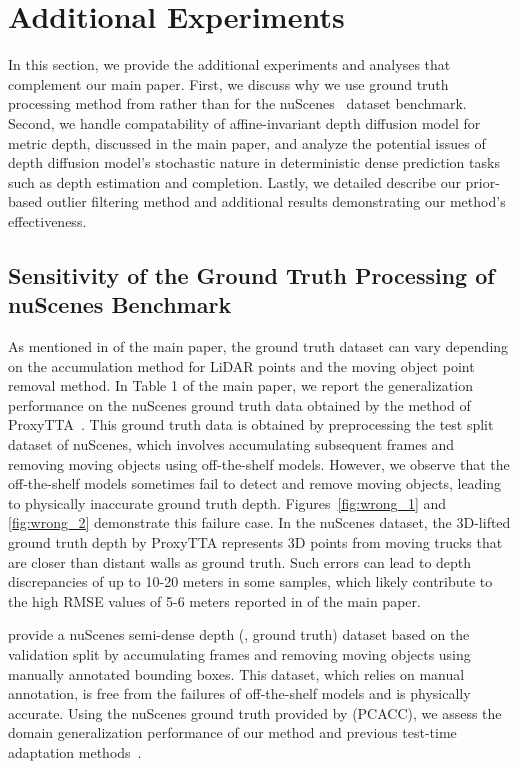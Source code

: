 \section{Additional Experiments}
In this section, we provide the additional experiments and analyses that complement our main paper.
First, we discuss why we use ground truth processing method from \citet{huang2022pcacc} rather than \citet{park2024testtime} for the nuScenes~\cite{caesar2020nuscene} dataset benchmark.
Second, we handle compatability of affine-invariant depth diffusion model for metric depth, discussed in the main paper, and analyze the potential issues of depth diffusion model's stochastic nature in deterministic dense prediction tasks such as depth estimation and completion. 
Lastly, we detailed describe our prior-based outlier filtering method and additional results demonstrating our method's effectiveness.




\subsection{Sensitivity of the Ground Truth Processing of nuScenes Benchmark}
As mentioned in  of the main paper, the ground truth dataset can vary depending on the accumulation method for LiDAR points and the moving object point removal method.
In Table 1 of the main paper, we report the generalization performance on the nuScenes ground truth data obtained 
by the method of ProxyTTA~\cite{park2024testtime}. This ground truth data is obtained by preprocessing the test split dataset of nuScenes, which involves accumulating subsequent frames and removing moving objects using off-the-shelf models.
However, we observe that the off-the-shelf models sometimes fail to detect and remove moving objects, leading to physically inaccurate ground truth depth. Figures~\ref{fig:wrong_1} and \ref{fig:wrong_2} demonstrate this failure case. In the nuScenes dataset, the 3D-lifted ground truth depth by ProxyTTA represents 3D points from moving trucks that are closer than distant walls as ground truth. Such errors can lead to depth discrepancies of up to 10-20 meters in some samples, which likely contribute to the high RMSE values of 5-6 meters reported in  of the main paper.

\citet{huang2022pcacc} provide a nuScenes semi-dense depth (\ie, ground truth) dataset based on the validation split by accumulating frames and removing moving objects using manually annotated bounding boxes. This dataset, which relies on manual annotation, is free from the failures of off-the-shelf models and is physically accurate.
Using the nuScenes ground truth provided by \citet{huang2022pcacc} (PCACC), we assess the domain generalization performance of our method and previous test-time adaptation methods~\cite{wang2021tent,wang2022continual, park2024testtime}. 

